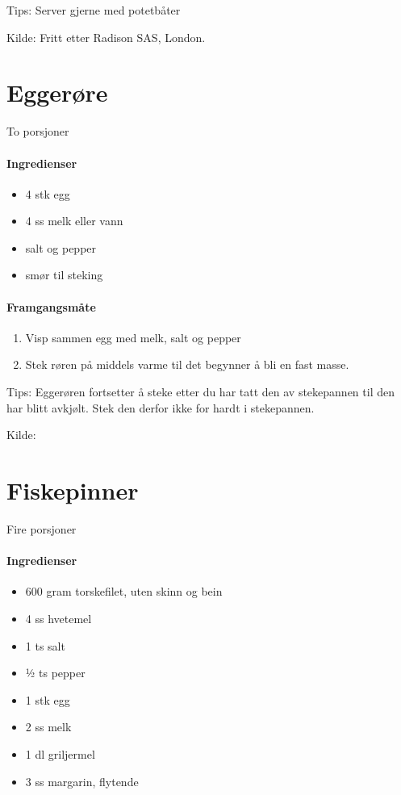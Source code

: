 \documentclass[12pt,a4paper]{book}
\begin{document}
Tips:
Server gjerne med potetbåter

Kilde: Fritt etter Radison SAS, London.
\clearpage{}
\clearpage{}\section{﻿Eggerøre}
To porsjoner

\paragraph{Ingredienser}
\begin{itemize}[noitemsep]
	\item 4 stk egg
	\item 4 ss melk eller vann
	\item salt og pepper
	\item smør til steking
\end{itemize}

\paragraph{Framgangsmåte}
\begin{enumerate}[noitemsep]
	\item Visp sammen egg med melk, salt og pepper
	\item Stek røren på middels varme til det begynner å bli en fast masse.
\end{enumerate}

Tips: Eggerøren fortsetter å steke etter du har tatt den av stekepannen til den har blitt avkjølt. Stek den derfor ikke for hardt i stekepannen.

Kilde: \href{http://www.matprat.no/sunn/sunne-oppskrifter/sunne-oppskrifter-god-samvittighet/eggerore/}{}
\clearpage{}
\clearpage{}\section{﻿Fiskepinner}
Fire porsjoner

\paragraph{Ingredienser}
\begin{itemize}[noitemsep]
	\item 600 gram  torskefilet, uten skinn og bein
	\item 4 ss hvetemel
	\item 1 ts salt
	\item ½ ts pepper
	\item 1 stk egg
	\item 2 ss melk
	\item 1 dl griljermel
	\item 3 ss margarin, flytende
\end{itemize}
\end{document}
